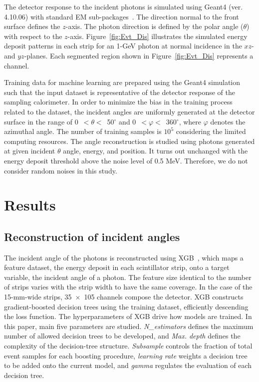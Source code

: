 \documentclass[12pt,times,draftclsnofoot,a4paper]{elsarticle}
\begin{document}
The detector response to the incident photons is simulated using Geant4 (ver. 4.10.06) with standard EM sub-packages~\cite{GEANT4}. The direction normal to the front surface defines the $z$-axis. The photon direction is defined by the polar angle ($\theta$) with respect to the $z$-axis. Figure~\ref{fig:Evt_Dis} illustrates the simulated energy deposit patterns in each strip for an 1-GeV photon at normal incidence in the $xz$- and $yz$-planes. Each segmented region shown in Figure~\ref{fig:Evt_Dis} represents a channel. 

Training data for machine learning are prepared using the Geant4 simulation such that the input dataset is representative of the detector response of the sampling calorimeter. In order to minimize the bias in the training process related to the dataset, the incident angles are uniformly generated at the detector surface in the range of 0~$<\theta<$~50$^{\circ}$ and 0~$<\varphi<$~360$^{\circ}$, where $\varphi$ denotes the azimuthal angle. The number of training samples is $10^{5}$ considering the limited computing resources. The angle reconstruction is studied using photons generated at given incident $\theta$ angle, energy, and position. It turns out unchanged with the energy deposit threshold above the noise level of 0.5 MeV. Therefore, we do not consider random noises in this study. 

\section{Results}
\label{sec:res}
\subsection{Reconstruction of incident angles}
\label{sec:reco}

The incident angle of the photons is reconstructed using XGB~\cite{xgboost:2016}, which maps a feature dataset, the energy deposit in each scintillator strip, onto a target variable, the incident angle of a photon. The feature size identical to the number of strips varies with the strip width to have the same coverage. In the case of the 15-mm-wide strips, 35~$\times$~105 channels compose the detector. XGB constructs gradient-boosted decision trees using the training dataset, efficiently descending the loss function. The hyperparameters of XGB drive how models are trained. In this paper, main five parameters are studied. \textit{N\_estimators} defines the maximum number of allowed decision trees to be developed, and \textit{Max. depth} defines the complexity of the decision-tree structure. \textit{Subsample} controls the fraction of total event samples for each boosting procedure, \textit{learning rate} weights a decision tree to be added onto the current model, and \textit{gamma} regulates the evaluation of each decision tree.
\end{document}
